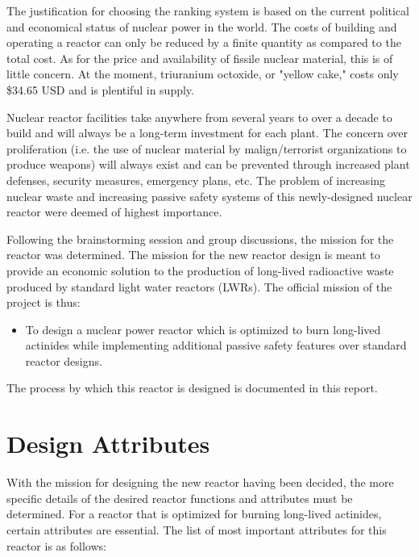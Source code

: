 \documentclass[]{report}
\begin{document}
The justification for choosing the ranking system is based on the current political and economical status of nuclear power in the world.  
The costs of building and operating a reactor can only be reduced by a finite quantity as compared to the total cost.  
As for the price and availability of fissile nuclear material, this is of little concern.
At the moment, triuranium octoxide, or "yellow cake," costs only \$34.65 USD and is plentiful in supply.  

Nuclear reactor facilities take anywhere from several years to over a decade to build and will always be a long-term investment for each plant.  
The concern over proliferation (i.e. the use of nuclear material by malign/terrorist organizations to produce weapons) will always exist and can be prevented through increased plant defenses, security measures, emergency plans, etc.  
The problem of increasing nuclear waste and increasing passive safety systems of this newly-designed nuclear reactor were deemed of highest importance.

Following the brainstorming session and group discussions, the mission for the reactor was determined.
The mission for the new reactor design is meant to provide an economic solution to the production of long-lived radioactive waste produced by standard light water reactors (LWRs).  The official mission of the project is thus:
\begin{itemize} 
  \item To design a nuclear power reactor which is optimized to burn long-lived actinides while implementing additional passive safety features over standard reactor designs.
\end{itemize}

The process by which this reactor is designed is documented in this report.

\section{Design Attributes}
With the mission for designing the new reactor having been decided, the more specific details of the desired reactor functions and attributes must be determined.
For a reactor that is optimized for burning long-lived actinides, certain attributes are essential.
The list of most important attributes for this reactor is as follows:
\end{document}
